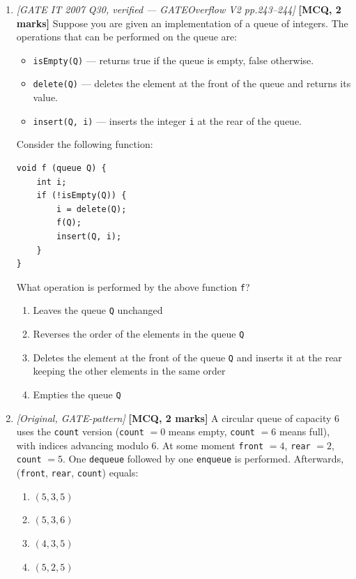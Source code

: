 \documentclass[11pt]{article}
\begin{document}
\begin{enumerate}
\item[\textbf{Q5}] \textit{[GATE IT 2007 Q30, verified --- GATEOverflow V2 pp.243--244]} \textbf{[MCQ, 2 marks]} Suppose you are given an implementation of a queue of integers. The operations that can be performed on the queue are:
\begin{itemize}
  \item[(i)] \texttt{isEmpty(Q)} --- returns true if the queue is empty, false otherwise.
  \item[(ii)] \texttt{delete(Q)} --- deletes the element at the front of the queue and returns its value.
  \item[(iii)] \texttt{insert(Q, i)} --- inserts the integer \texttt{i} at the rear of the queue.
\end{itemize}
Consider the following function:
\begin{verbatim}
void f (queue Q) {
    int i;
    if (!isEmpty(Q)) {
        i = delete(Q);
        f(Q);
        insert(Q, i);
    }
}
\end{verbatim}
What operation is performed by the above function \texttt{f}?
\begin{enumerate}
  \item[(A)] Leaves the queue \texttt{Q} unchanged
  \item[(B)] Reverses the order of the elements in the queue \texttt{Q}
  \item[(C)] Deletes the element at the front of the queue \texttt{Q} and inserts it at the rear keeping the other elements in the same order
  \item[(D)] Empties the queue \texttt{Q}
\end{enumerate}

\item[\textbf{Q6}] \textit{[Original, GATE-pattern]} \textbf{[MCQ, 2 marks]} A circular queue of capacity $6$ uses the \texttt{count} version (\texttt{count} $= 0$ means empty, \texttt{count} $= 6$ means full), with indices advancing modulo $6$. At some moment \texttt{front} $= 4$, \texttt{rear} $= 2$, \texttt{count} $= 5$. One \texttt{dequeue} followed by one \texttt{enqueue} is performed. Afterwards, (\texttt{front}, \texttt{rear}, \texttt{count}) equals:
\begin{enumerate}
  \item[(A)] $(5, 3, 5)$
  \item[(B)] $(5, 3, 6)$
  \item[(C)] $(4, 3, 5)$
  \item[(D)] $(5, 2, 5)$
\end{enumerate}


\end{enumerate}
\end{document}
